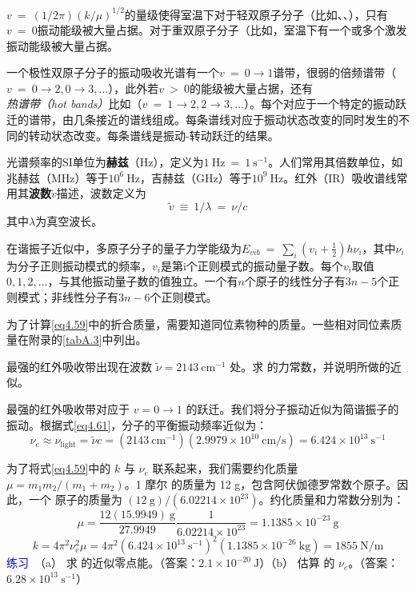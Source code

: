\documentclass[12pt,a4paper,openany]{ctexbook}
\begin{document}
\begin{flushleft}
$v\ =\ (1/2\pi)(k/\mu)^{1/2}$的量级使得室温下对于轻双原子分子（比如、、），只有$v\ =\ 0$振动能级被大量占据。对于重双原子分子（比如，室温下有一个或多个激发振动能级被大量占据。

一个极性双原子分子的振动吸收光谱有一个$v\ =\ 0\to1$谱带，很弱的倍频谱带（$v\ =\ 0\to2,0\to3,\dots$），此外若$v\ >\ 0$的能级被大量占据，还有\textit{热谱带（hot bands）}比如（$v\ =\ 1\to2,2\to3,\dots$）。每个对应于一个特定的振动跃迁的谱带，由几条接近的谱线组成。每条谱线对应于振动状态改变的同时发生的不同的转动状态改变。每条谱线是振动-转动跃迁的结果。

光谱频率的SI单位为\textbf{赫兹}（Hz），定义为$1\ \text{Hz}\ =\ 1\ \text{s}^{-1}$。人们常用其倍数单位，如兆赫兹（MHz）等于$10^6\ $Hz，吉赫兹（GHz）等于$10^9\ $Hz。红外（IR）吸收谱线常用其\textbf{波数}$\tilde{v}$描述，波数定义为
\begin{equation}
    \boxed{\tilde{v}\ \equiv\ 1/\lambda\ =\ \nu/c} \label{eq4.64}
\end{equation}
其中$\lambda$为真空波长。

在谐振子近似中，多原子分子的量子力学能级为$E_{vib}\ =\ \sum_i(v_i+\frac{1}{2})h\nu_i$，其中$\nu_i$为分子正则振动模式的频率，$v_i$是第i个正则模式的振动量子数。每个$v_i$取值$0,1,2,\dots$，与其他振动量子数的值独立。一个有$n$个原子的线性分子有$3n-5$个正则模式；非线性分子有$3n-6$个正则模式。

为了计算\eqref{eq4.59}中的折合质量，需要知道同位素物种的质量。一些相对同位素质量在附录的\eqref{tabA.3}中列出。
\end{flushleft}
\begin{examplebox}
    \setlength{\parindent}{2em}
 最强的红外吸收带出现在波数 \(\tilde{\nu} = 2143\ \mathrm{cm^{-1}}\) 处。求  的力常数，并说明所做的近似。

最强的红外吸收带对应于 \(v = 0 \to 1\) 的跃迁。我们将分子振动近似为简谐振子的振动。根据式\eqref{eq4.61}，分子的平衡振动频率近似为：
\[
\nu_e \approx \nu_{\text{light}} = \tilde{\nu}c = (2143\ \mathrm{cm^{-1}})(2.9979 \times 10^{10}\ \mathrm{cm/s}) = 6.424 \times 10^{13}\ \mathrm{s^{-1}}
\]

为了将式\eqref{eq4.59}中的 \(k\) 与 \(\nu_e\) 联系起来，我们需要约化质量 \(\mu = m_1m_2/(m_1 + m_2)\)。1 摩尔  的质量为 12 g，包含阿伏伽德罗常数个原子。因此，一个  原子的质量为 \((12\ \mathrm{g})/(6.02214 \times 10^{23})\)。约化质量和力常数分别为：
\[
\mu = \frac{12(15.9949)\ \mathrm{g}}{27.9949} \frac{1}{6.02214 \times 10^{23}} = 1.1385 \times 10^{-23}\ \mathrm{g}
\]
\[
k = 4\pi^2\nu_e^2 \mu = 4\pi^2(6.424 \times 10^{13}\ \mathrm{s^{-1}})^2 (1.1385 \times 10^{-26}\ \mathrm{kg}) = 1855\ \mathrm{N/m}
\]
\textcolor{blue}{\large 练习}\ （a） 求  的近似零点能。（答案：\(2.1 \times 10^{-20}\ \mathrm{J}\)）（b） 估算  的 \(\nu_e\)。（答案：\(6.28 \times 10^{13}\ \mathrm{s^{-1}}\)）
\end{examplebox}
\end{document}
